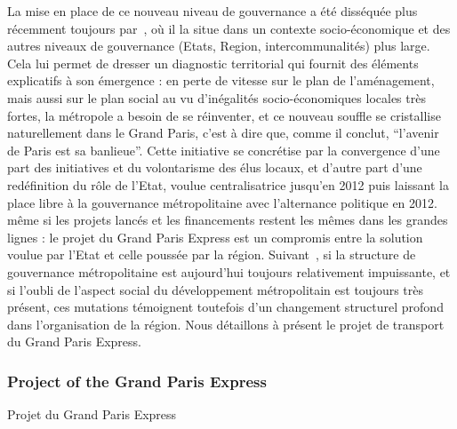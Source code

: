 La mise en place de ce nouveau niveau de gouvernance a été disséquée plus récemment toujours par~\cite{gilli2014gouverner}, où il la situe dans un contexte socio-économique et des autres niveaux de gouvernance (Etats, Region, intercommunalités) plus large. Cela lui permet de dresser un diagnostic territorial qui fournit des éléments explicatifs à son émergence : en perte de vitesse sur le plan de l'aménagement, mais aussi sur le plan social au vu d'inégalités socio-économiques locales très fortes, la métropole a besoin de se réinventer, et ce nouveau souffle se cristallise naturellement dans le Grand Paris, c'est à dire que, comme il conclut, ``l'avenir de Paris est sa banlieue''. Cette initiative se concrétise par la convergence d'une part des initiatives et du volontarisme des élus locaux, et d'autre part d'une redéfinition du rôle de l'Etat, voulue centralisatrice jusqu'en 2012 puis laissant la place libre à la gouvernance métropolitaine avec l'alternance politique en 2012. même si les projets lancés et les financements restent les mêmes dans les grandes lignes : le projet du Grand Paris Express est un compromis entre la solution voulue par l'Etat et celle poussée par la région. Suivant~\cite{desjardins2016grand}, si la structure de gouvernance métropolitaine est aujourd'hui toujours relativement impuissante, et si l'oubli de l'aspect social du développement métropolitain est toujours très présent, ces mutations témoignent toutefois d'un changement structurel profond dans l'organisation de la région. Nous détaillons à présent le projet de transport du Grand Paris Express.







\subsubsection{Project of the Grand Paris Express}{Projet du Grand Paris Express}



